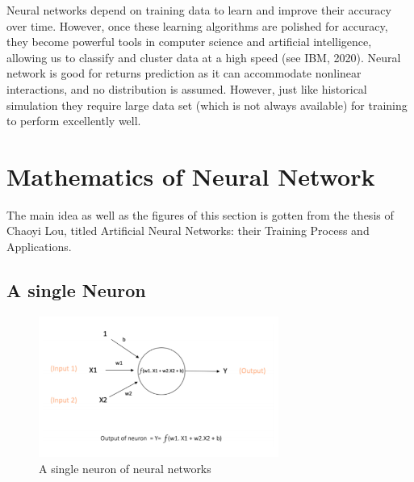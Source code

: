 \documentclass[a4paper,11pt,oneside]{book}
\begin{document}
Neural networks depend on training data to learn and improve their accuracy over time. However, once these learning algorithms are polished for accuracy, they become powerful tools in computer science and artificial intelligence, allowing us to classify and cluster data at a high speed (see IBM, 2020).
\newline\newline
Neural network is good for returns prediction as it can accommodate nonlinear interactions, and no distribution is assumed. However, just like historical simulation they require large data set (which is not always available) for training to perform excellently well.





\section{Mathematics of Neural Network}
The main idea as well as the figures of this section is gotten from the thesis of Chaoyi Lou, titled Artificial Neural Networks:
their Training Process and Applications.

\subsection{A single Neuron}
\begin{figure}[!h]
	\centering
	\includegraphics[width=0.7\textwidth]{figures/neuron}
	\caption{A single neuron of neural networks}
	\label{secondfig}
\end{figure}
\end{document}
